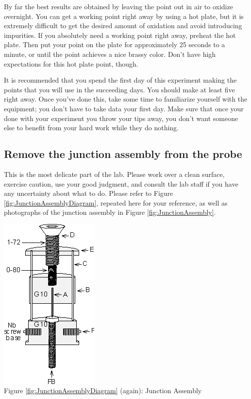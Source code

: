 \documentclass{../lab}
\begin{document}
By far the best results are obtained by leaving the point out in air to oxidize overnight. You can get a working point right away by using a hot plate, but it is extremely difficult to get the desired amount of oxidation and avoid introducing impurities. If you absolutely need a working point right away, preheat the hot plate. Then put your point on the plate for approximately 25 seconds to a minute, or until the point achieves a nice brassy color. Don't have high expectations for this hot plate point, though.

It is recommended that you spend the first day of this experiment making the points that you will use in the succeeding days. You should make at least five right away. Once you've done this, take some time to familiarize yourself with the equipment; you don't have to take data your first day. Make sure that once your done with your experiment you throw your tips away, you don't want someone else to benefit from your hard work while they do nothing.

\subsection{Remove the junction assembly from the probe}

This is the most delicate part of the lab. Please work over a clean surface, exercise caution, use your good judgment, and consult the lab staff if you have any uncertainty about what to do. Please refer to Figure \ref{fig:JunctionAssemblyDiagram}, repeated here for your reference, as well as photographs of the junction assembly in Figure \ref{fig:JunctionAssembly}.

\begin{center}
    \href{http://experimentationlab.berkeley.edu/sites/default/files/images/JOS5.gif}{\includegraphics[width=0.5\linewidth]{images/JOS5.png}} \\
    Figure \ref{fig:JunctionAssemblyDiagram} (again): Junction Assembly
\end{center}
\end{document}
